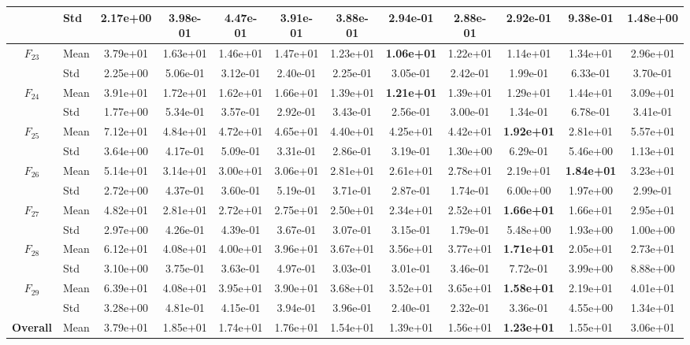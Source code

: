 \begin{center}
\begin{longtable}{clcccccccccc}
 & Std & 2.17e+00 & 3.98e-01 & 4.47e-01 & 3.91e-01 & 3.88e-01 & 2.94e-01 & 2.88e-01 & 2.92e-01 & 9.38e-01 & 1.48e+00 \\
\midrule
$F_{23}$ & Mean & 3.79e+01 & 1.63e+01 & 1.46e+01 & 1.47e+01 & 1.23e+01 & \textbf{1.06e+01} & 1.22e+01 & 1.14e+01 & 1.34e+01 & 2.96e+01 \\
 & Std & 2.25e+00 & 5.06e-01 & 3.12e-01 & 2.40e-01 & 2.25e-01 & 3.05e-01 & 2.42e-01 & 1.99e-01 & 6.33e-01 & 3.70e-01 \\
\midrule
$F_{24}$ & Mean & 3.91e+01 & 1.72e+01 & 1.62e+01 & 1.66e+01 & 1.39e+01 & \textbf{1.21e+01} & 1.39e+01 & 1.29e+01 & 1.44e+01 & 3.09e+01 \\
 & Std & 1.77e+00 & 5.34e-01 & 3.57e-01 & 2.92e-01 & 3.43e-01 & 2.56e-01 & 3.00e-01 & 1.34e-01 & 6.78e-01 & 3.41e-01 \\
\midrule
$F_{25}$ & Mean & 7.12e+01 & 4.84e+01 & 4.72e+01 & 4.65e+01 & 4.40e+01 & 4.25e+01 & 4.42e+01 & \textbf{1.92e+01} & 2.81e+01 & 5.57e+01 \\
 & Std & 3.64e+00 & 4.17e-01 & 5.09e-01 & 3.31e-01 & 2.86e-01 & 3.19e-01 & 1.30e+00 & 6.29e-01 & 5.46e+00 & 1.13e+01 \\
\midrule
$F_{26}$ & Mean & 5.14e+01 & 3.14e+01 & 3.00e+01 & 3.06e+01 & 2.81e+01 & 2.61e+01 & 2.78e+01 & 2.19e+01 & \textbf{1.84e+01} & 3.23e+01 \\
 & Std & 2.72e+00 & 4.37e-01 & 3.60e-01 & 5.19e-01 & 3.71e-01 & 2.87e-01 & 1.74e-01 & 6.00e+00 & 1.97e+00 & 2.99e-01 \\
\midrule
$F_{27}$ & Mean & 4.82e+01 & 2.81e+01 & 2.72e+01 & 2.75e+01 & 2.50e+01 & 2.34e+01 & 2.52e+01 & \textbf{1.66e+01} & 1.66e+01 & 2.95e+01 \\
 & Std & 2.97e+00 & 4.26e-01 & 4.39e-01 & 3.67e-01 & 3.07e-01 & 3.15e-01 & 1.79e-01 & 5.48e+00 & 1.93e+00 & 1.00e+00 \\
\midrule
$F_{28}$ & Mean & 6.12e+01 & 4.08e+01 & 4.00e+01 & 3.96e+01 & 3.67e+01 & 3.56e+01 & 3.77e+01 & \textbf{1.71e+01} & 2.05e+01 & 2.73e+01 \\
 & Std & 3.10e+00 & 3.75e-01 & 3.63e-01 & 4.97e-01 & 3.03e-01 & 3.01e-01 & 3.46e-01 & 7.72e-01 & 3.99e+00 & 8.88e+00 \\
\midrule
$F_{29}$ & Mean & 6.39e+01 & 4.08e+01 & 3.95e+01 & 3.90e+01 & 3.68e+01 & 3.52e+01 & 3.65e+01 & \textbf{1.58e+01} & 2.19e+01 & 4.01e+01 \\
 & Std & 3.28e+00 & 4.81e-01 & 4.15e-01 & 3.94e-01 & 3.96e-01 & 2.40e-01 & 2.32e-01 & 3.36e-01 & 4.55e+00 & 1.34e+01 \\
\midrule
\textbf{Overall} & Mean & 3.79e+01 & 1.85e+01 & 1.74e+01 & 1.76e+01 & 1.54e+01 & 1.39e+01 & 1.56e+01 & \textbf{1.23e+01} & 1.55e+01 & 3.06e+01 \\
\bottomrule
\end{longtable}
\end{center}
